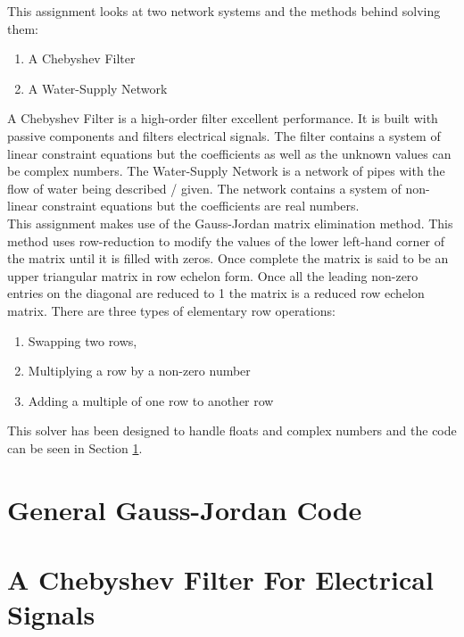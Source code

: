 \documentclass[11pt,a4paper]{article}
\begin{document}
This assignment looks at two network systems and the methods behind solving them:

\begin{enumerate}
  \item A Chebyshev Filter
  \item A Water-Supply Network
\end{enumerate}

A Chebyshev Filter is a high-order filter excellent performance. It is built with passive components and filters electrical signals. The filter contains a system of linear constraint equations but the coefficients as well as the unknown values can be complex numbers. The Water-Supply Network is a network of pipes with the flow of water being described / given. The network contains a system of non-linear constraint equations but the coefficients are real numbers.\\

\bigskip
This assignment makes use of the Gauss-Jordan matrix elimination method. This method uses row-reduction to  modify the values of the lower left-hand corner of the matrix until it is filled with zeros. Once complete the matrix is said to be an upper triangular matrix in row echelon form. Once all the leading non-zero entries on the diagonal are reduced to 1 the matrix is a reduced row echelon matrix. There are three types of elementary row operations:
\begin{enumerate}
  \item Swapping two rows,
  \item Multiplying a row by a non-zero number
  \item Adding a multiple of one row to another row
\end{enumerate}
This solver has been designed to handle floats and complex numbers and the code can be seen in Section \ref{sec:GaussJordanCode}. 

\newpage

\section{General Gauss-Jordan Code} \label{sec:GaussJordanCode}

\newpage

\section{A Chebyshev Filter For Electrical Signals} \label{sec:Cheb}
\end{document}

